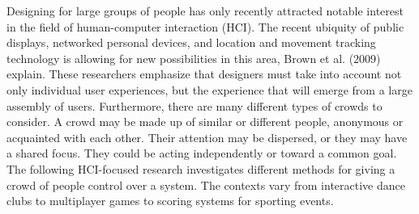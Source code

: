 Designing for large groups of people has only recently attracted notable interest in the field of human-computer interaction (HCI). The recent ubiquity of public displays, networked personal devices, and location and movement tracking technology is allowing for new possibilities in this area, Brown et al. (2009) explain. These researchers emphasize that designers must take into account not only individual user experiences, but the experience that will emerge from a large assembly of users. Furthermore, there are many different types of crowds to consider. A crowd may be made up of similar or different people, anonymous or acquainted with each other. Their attention may be dispersed, or they may have a shared focus. They could be acting independently or toward a common goal. The following HCI-focused research investigates different methods for giving a crowd of people control over a system. The contexts vary from interactive dance clubs to multiplayer games to scoring systems for sporting events.

